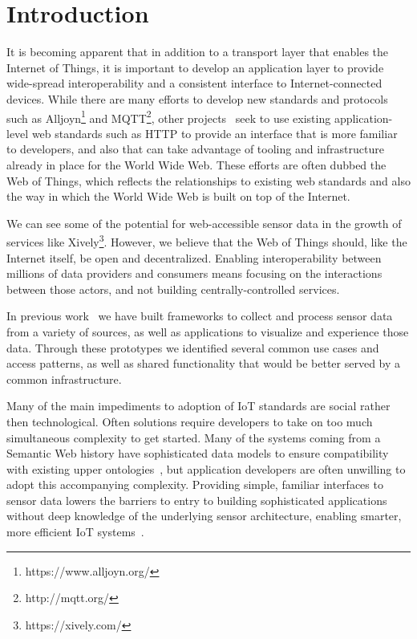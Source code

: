 \documentclass{acm_proc_article-sp}
\begin{document}
\section{Introduction}

It is becoming apparent that in addition to a transport layer that enables the
Internet of Things, it is important to develop an application layer to provide
wide-spread interoperability and a consistent interface to Internet-connected
devices. While there are many efforts to develop new standards and
protocols such as Alljoyn\footnote{https://www.alljoyn.org/} and
MQTT\footnote{http://mqtt.org/}, other projects~\cite{guinard2010} seek to
use existing application-level web standards such as HTTP to provide an
interface that is more familiar to developers, and also that can take advantage
of tooling and infrastructure already in place for the World Wide Web.
These efforts are often dubbed the Web of Things, which reflects the
relationships to existing web standards and also the way in which the World
Wide Web is built on top of the Internet.

We can see some of the potential for web-accessible sensor data in the growth
of services like Xively\footnote{https://xively.com/}. However, we believe that
the Web of Things should, like the Internet itself, be open and decentralized.
Enabling interoperability between millions of data providers and consumers
means focusing on the interactions between those actors, and not building
centrally-controlled services.

In previous work~\cite{doppellab}\cite{gestures} we have built frameworks to collect
and process sensor data from a variety of sources, as well as applications to
visualize and experience those data. Through these prototypes we identified
several common use cases and access patterns, as well as shared functionality
that would be better served by a common infrastructure.

Many of the main impediments to adoption of IoT standards are social
rather then technological. Often solutions require developers to take on too much
simultaneous complexity to get started. Many of the systems coming from a Semantic
Web history have sophisticated data models to ensure compatibility with existing
upper ontologies~\cite{w3contology}\cite{broring2011}\cite{eid2007}, but
application developers are often unwilling to adopt this accompanying
complexity. Providing simple, familiar interfaces to sensor data lowers
the barriers to entry to building sophisticated applications without deep
knowledge of the underlying sensor architecture, enabling smarter, more
efficient IoT systems~\cite{aldrich2013}.
\end{document}
